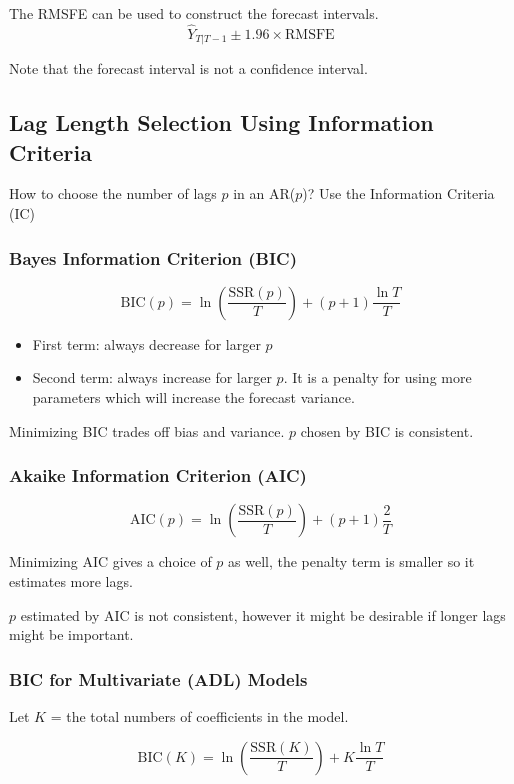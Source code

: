 \documentclass{article}
\begin{document}
The RMSFE can be used to construct the forecast intervals.
\[
	\hat{Y}_{T|T-1} \pm 1.96 \times \text{RMSFE}
\]

Note that the forecast interval is not a confidence interval.

\subsection{Lag Length Selection Using Information Criteria}

How to choose the number of lags $p$ in an AR($p$)? Use the Information Criteria (IC)

\subsubsection{Bayes Information Criterion (BIC)}

\[
	\text{BIC}(p) = \ln \left(
		\dfrac{\text{SSR}(p)}{T}
	\right) + (p+1) \dfrac{\ln T}{T}
\]

\begin{itemize}
	\item First term: always decrease for larger $p$
	\item Second term: always increase for larger $p$.
			It is a penalty for using more parameters which will increase the forecast variance.
\end{itemize}

Minimizing BIC trades off bias and variance. $p$ chosen by BIC is consistent.

\subsubsection{Akaike Information Criterion (AIC)}

\[
	\text{AIC}(p) = \ln \left(
		\dfrac{\text{SSR}(p)}{T}
	\right) + (p+1) \dfrac{2}{T}
\]

Minimizing AIC gives a choice of $p$ as well,
the penalty term is smaller so it estimates more lags.

$p$ estimated by AIC is not consistent, however it might be desirable if longer lags might be important.

\subsubsection{BIC for Multivariate (ADL) Models}

Let $K$ = the total numbers of coefficients in the model.

\[
	\text{BIC}(K) = \ln \left(
		\dfrac{\text{SSR}(K)}{T}
	\right) + K \dfrac{\ln T}{T}
\]
\end{document}
